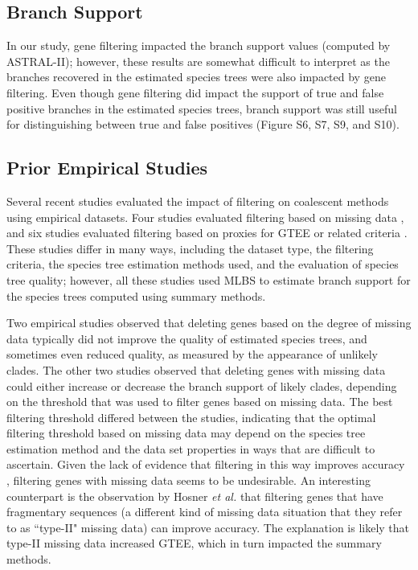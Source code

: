 \subsection{Branch Support}
In our study, gene filtering impacted the branch support values (computed by ASTRAL-II); however, these results are somewhat difficult to interpret as the branches recovered in the estimated species trees were also impacted by gene filtering.
Even though gene filtering did impact the support of true and false positive branches in the estimated species trees, branch support was still useful for distinguishing between true and false positives (Figure S6, S7, S9, and S10).

\subsection{Prior Empirical Studies}
Several recent studies evaluated the impact of filtering on coalescent methods using empirical datasets. Four studies evaluated filtering based on missing data \cite{chen2015selecting, hosner2016empirical,streicher2016how, longo2017phylogenomic}, and six studies evaluated filtering based on proxies for GTEE or related criteria \cite{chen2015selecting, simmons2016effects, longo2017phylogenomic, blom2017accounting, hosner2016empirical, meiklejohn2016analysis}. These studies differ in many ways, including the dataset type, the filtering criteria, the species tree estimation methods used, and the evaluation of species tree quality; however, all these studies used MLBS to estimate branch support for the species trees computed using summary methods.

Two empirical studies \cite{chen2015selecting, hosner2016empirical} observed that deleting genes based on the degree of missing data typically did not improve the quality of estimated species trees, and sometimes even reduced quality, as measured by the appearance of unlikely clades. 
The other two studies \cite{streicher2016how, longo2017phylogenomic} observed that deleting genes with missing data could either increase or decrease the branch support of likely clades, depending on the threshold that was used to filter genes based on missing data.
The best filtering threshold differed between the studies, indicating that the optimal filtering threshold based on missing data may depend on the species tree estimation method and the data set properties in ways that are difficult to ascertain.
Given the lack of evidence that filtering in this way improves accuracy \cite{chen2015selecting, hosner2016empirical}, filtering genes with missing data seems to be undesirable. 
An interesting counterpart is the observation by Hosner {\em et al.} \cite{hosner2016empirical} that filtering genes that have fragmentary sequences (a different kind of missing data situation that they refer to as ``type-II" missing data) can improve accuracy. 
The explanation is likely that type-II missing data increased GTEE, which in turn impacted the summary methods. 


